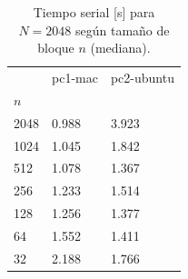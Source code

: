 \begin{table}[H]
\centering\small
\caption{Tiempo serial [s] para $N=2048$ según tamaño de bloque $n$ (mediana).}
\label{tab:a_serial_bloque}
\begin{tabular}{lll}
\toprule
 & pc1-mac & pc2-ubuntu \\
$n$ &  &  \\
\midrule
2048 & 0.988 & 3.923 \\
1024 & 1.045 & 1.842 \\
512 & 1.078 & 1.367 \\
256 & 1.233 & 1.514 \\
128 & 1.256 & 1.377 \\
64 & 1.552 & 1.411 \\
32 & 2.188 & 1.766 \\
\bottomrule
\end{tabular}
\end{table}
